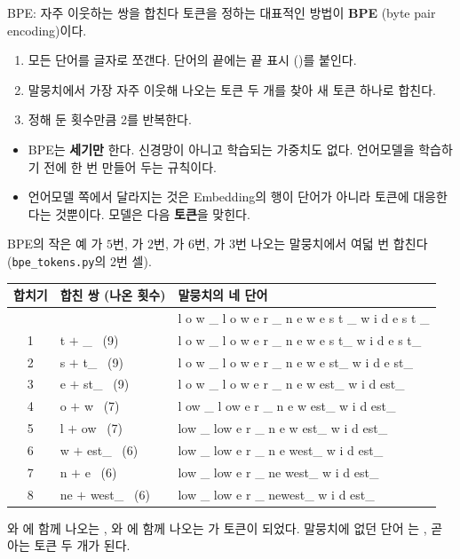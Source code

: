 \documentclass[aspectratio=169,11pt]{beamer}
\begin{document}
\begin{frame}{BPE: 자주 이웃하는 쌍을 합친다}
토큰을 정하는 대표적인 방법이 \textbf{BPE} (byte pair encoding)이다.
\begin{enumerate}
\item 모든 단어를 글자로 쪼갠다. 단어의 끝에는 끝 표시 (\w{\_})를 붙인다.
\item 말뭉치에서 가장 자주 이웃해 나오는 토큰 두 개를 찾아 새 토큰 하나로 합친다.
\item 정해 둔 횟수만큼 2를 반복한다.
\end{enumerate}
\vskip2mm
\begin{itemize}
\item BPE는 \textbf{세기만} 한다. 신경망이 아니고 학습되는 가중치도 없다.
  언어모델을 학습하기 전에 한 번 만들어 두는 규칙이다.
\item 언어모델 쪽에서 달라지는 것은 Embedding의 행이 단어가 아니라 토큰에 대응한다는 것뿐이다.
  모델은 다음 \textbf{토큰}을 맞힌다.
\end{itemize}
\end{frame}

\begin{frame}{BPE의 작은 예}
가 $5$번, 가 $2$번, 가 $6$번, 가 $3$번 나오는 말뭉치에서
여덟 번 합친다 (\texttt{bpe\_tokens.py}의 2번 셀).
\begin{center}
\ttfamily\footnotesize
\begin{tabular}{@{}cll@{}}
\toprule
\sffamily 합치기 & \sffamily 합친 쌍 (나온 횟수) & \sffamily 말뭉치의 네 단어 \\
\midrule
& & l o w \_ \quad l o w e r \_ \quad n e w e s t \_ \quad w i d e s t \_ \\
1 & t $+$ \_ \ (9) & l o w \_ \quad l o w e r \_ \quad n e w e s t\_ \quad w i d e s t\_ \\
2 & s $+$ t\_ \ (9) & l o w \_ \quad l o w e r \_ \quad n e w e st\_ \quad w i d e st\_ \\
3 & e $+$ st\_ \ (9) & l o w \_ \quad l o w e r \_ \quad n e w est\_ \quad w i d est\_ \\
4 & o $+$ w \ (7) & l ow \_ \quad l ow e r \_ \quad n e w est\_ \quad w i d est\_ \\
5 & l $+$ ow \ (7) & low \_ \quad low e r \_ \quad n e w est\_ \quad w i d est\_ \\
6 & w $+$ est\_ \ (6) & low \_ \quad low e r \_ \quad n e west\_ \quad w i d est\_ \\
7 & n $+$ e \ (6) & low \_ \quad low e r \_ \quad ne west\_ \quad w i d est\_ \\
8 & ne $+$ west\_ \ (6) & low \_ \quad low e r \_ \quad newest\_ \quad w i d est\_ \\
\bottomrule
\end{tabular}
\end{center}
와 에 함께 나오는 , 와 에 함께 나오는 가
토큰이 되었다.
말뭉치에 없던 단어 는  , 곧 아는 토큰 두 개가 된다.
\end{frame}
\end{document}

